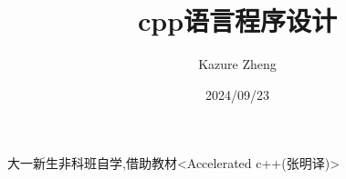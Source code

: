 \documentclass{elegantbook}
\title{cpp语言程序设计}
\author{Kazure Zheng}
\date{2024/09/23}
\begin{document}
    \maketitle
    \tableofcontents

    大一新生非科班自学,借助教材<Accelerated c++(张明译)>

    
    \newpage
    
\end{document}
